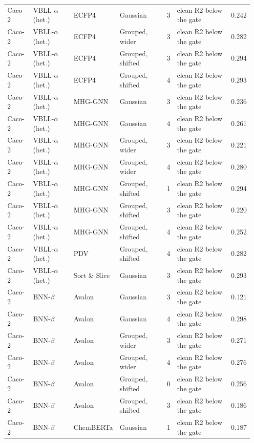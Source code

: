 {\begin{longtable}{llllcll}
Caco-2 & VBLL-$\alpha$ (het.) & ECFP4 & Gaussian & 3 & clean R2 below the gate & 0.242 \\
Caco-2 & VBLL-$\alpha$ (het.) & ECFP4 & Grouped, wider & 3 & clean R2 below the gate & 0.282 \\
Caco-2 & VBLL-$\alpha$ (het.) & ECFP4 & Grouped, shifted & 3 & clean R2 below the gate & 0.294 \\
Caco-2 & VBLL-$\alpha$ (het.) & ECFP4 & Grouped, shifted & 4 & clean R2 below the gate & 0.293 \\
Caco-2 & VBLL-$\alpha$ (het.) & MHG-GNN & Gaussian & 3 & clean R2 below the gate & 0.236 \\
Caco-2 & VBLL-$\alpha$ (het.) & MHG-GNN & Gaussian & 4 & clean R2 below the gate & 0.261 \\
Caco-2 & VBLL-$\alpha$ (het.) & MHG-GNN & Grouped, wider & 3 & clean R2 below the gate & 0.221 \\
Caco-2 & VBLL-$\alpha$ (het.) & MHG-GNN & Grouped, wider & 4 & clean R2 below the gate & 0.280 \\
Caco-2 & VBLL-$\alpha$ (het.) & MHG-GNN & Grouped, shifted & 1 & clean R2 below the gate & 0.294 \\
Caco-2 & VBLL-$\alpha$ (het.) & MHG-GNN & Grouped, shifted & 3 & clean R2 below the gate & 0.220 \\
Caco-2 & VBLL-$\alpha$ (het.) & MHG-GNN & Grouped, shifted & 4 & clean R2 below the gate & 0.252 \\
Caco-2 & VBLL-$\alpha$ (het.) & PDV & Grouped, shifted & 4 & clean R2 below the gate & 0.282 \\
Caco-2 & VBLL-$\alpha$ (het.) & Sort \& Slice & Gaussian & 3 & clean R2 below the gate & 0.293 \\
Caco-2 & BNN-$\beta$ & Avalon & Gaussian & 3 & clean R2 below the gate & 0.121 \\
Caco-2 & BNN-$\beta$ & Avalon & Gaussian & 4 & clean R2 below the gate & 0.298 \\
Caco-2 & BNN-$\beta$ & Avalon & Grouped, wider & 3 & clean R2 below the gate & 0.271 \\
Caco-2 & BNN-$\beta$ & Avalon & Grouped, wider & 4 & clean R2 below the gate & 0.276 \\
Caco-2 & BNN-$\beta$ & Avalon & Grouped, shifted & 0 & clean R2 below the gate & 0.256 \\
Caco-2 & BNN-$\beta$ & Avalon & Grouped, shifted & 3 & clean R2 below the gate & 0.186 \\
Caco-2 & BNN-$\beta$ & ChemBERTa & Gaussian & 1 & clean R2 below the gate & 0.187 \\

\end{longtable}}

